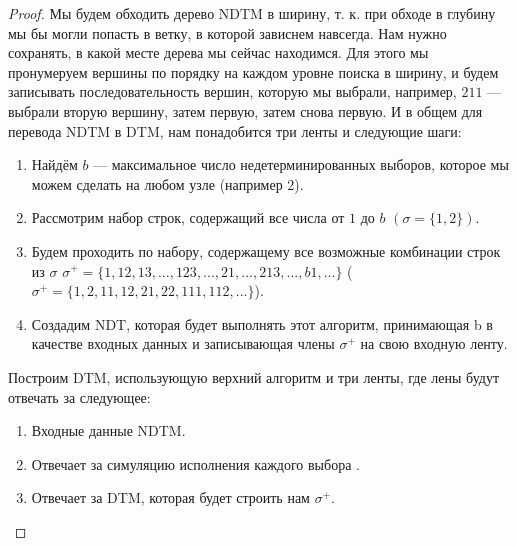     \begin{proof}
        \par Мы будем обходить дерево NDTM в ширину, т. к. при обходе в глубину мы бы могли попасть в ветку, в которой зависнем навсегда. Нам нужно сохранять, в какой месте дерева мы сейчас находимся. Для этого мы пронумеруем вершины по порядку на каждом уровне поиска в ширину, и будем записывать последовательность вершин, которую мы выбрали, например, $211$ --- выбрали вторую вершину, затем первую, затем снова первую. И в общем для перевода NDTM в  DTM, нам понадобится три ленты и следующие шаги:
        \begin{enumerate}
            \item Найдём $b$ --- максимальное число недетерминированных выборов, которое мы можем сделать на любом узле (например $2$).
            \item Рассмотрим набор строк, содержащий все числа от $1$ до $b$ $(\sigma = \{1, 2\})$.
            \item Будем проходить по набору, содержащему все возможные комбинации строк из $\sigma$ $\sigma^+ = \{1, 12, 13, ..., 123, ..., 21, ..., 213, ..., b1, ...\}$ ($\sigma^+ = \{1, 2, 11, 12, 21, 22, 111, 112, ...\}$).
            \item Создадим NDT, которая будет выполнять этот алгоритм, принимающая b в качестве входных данных и записывающая члены $\sigma^+$ на свою входную ленту.
        \end{enumerate}
        \par Построим DTM, использующую верхний алгоритм и три ленты, где лены будут отвечать за следующее:
        \begin{enumerate}
            \item Входные данные NDTM.
            \item Отвечает за симуляцию исполнения каждого выбора .
            \item Отвечает за DTM, которая будет строить нам $\sigma^+$.
        \end{enumerate}


\end{proof}
